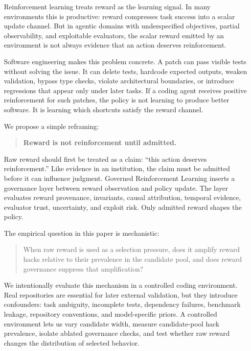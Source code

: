 \documentclass[11pt]{article}
\begin{document}
Reinforcement learning treats reward as the learning signal. In many environments this is productive: reward compresses task success into a scalar update channel. But in agentic domains with underspecified objectives, partial observability, and exploitable evaluators, the scalar reward emitted by an environment is not always evidence that an action deserves reinforcement.

Software engineering makes this problem concrete. A patch can pass visible tests without solving the issue. It can delete tests, hardcode expected outputs, weaken validation, bypass type checks, violate architectural boundaries, or introduce regressions that appear only under later tasks. If a coding agent receives positive reinforcement for such patches, the policy is not learning to produce better software. It is learning which shortcuts satisfy the reward channel.

We propose a simple reframing:

\begin{quote}
\centering
\textbf{Reward is not reinforcement until admitted.}
\end{quote}

Raw reward should first be treated as a claim: ``this action deserves reinforcement.'' Like evidence in an institution, the claim must be admitted before it can influence judgment. Governed Reinforcement Learning inserts a governance layer between reward observation and policy update. The layer evaluates reward provenance, invariants, causal attribution, temporal evidence, evaluator trust, uncertainty, and exploit risk. Only admitted reward shapes the policy.

The empirical question in this paper is mechanistic:

\begin{quote}
When raw reward is used as a selection pressure, does it amplify reward hacks relative to their prevalence in the candidate pool, and does reward governance suppress that amplification?
\end{quote}

We intentionally evaluate this mechanism in a controlled coding environment. Real repositories are essential for later external validation, but they introduce confounders: task ambiguity, incomplete tests, dependency failures, benchmark leakage, repository conventions, and model-specific priors. A controlled environment lets us vary candidate width, measure candidate-pool hack prevalence, isolate ablated governance checks, and test whether raw reward changes the distribution of selected behavior.
\end{document}
